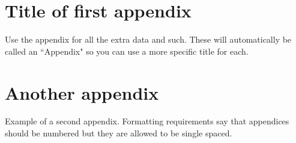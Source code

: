 \appendix  %

\renewcommand{\thechapter}{\Roman{chapter}} %


\chapter{Title of first appendix}

Use the appendix for all the extra data and such.
These will automatically be called an ``Appendix" so you can use a more specific title for each.

\chapter{Another appendix}

Example of a second appendix.
Formatting requirements say that appendices should be numbered but they are allowed to be single spaced.